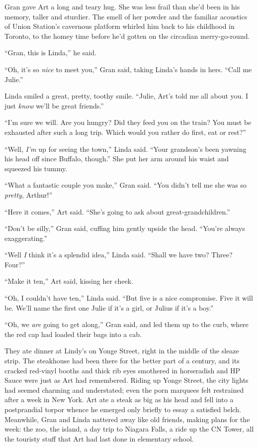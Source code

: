 Gran gave Art a long and teary hug. She was less frail than she’d
been in his memory, taller and sturdier. The smell of her powder
and the familiar acoustics of Union Station’s cavernous platform
whirled him back to his childhood in Toronto, to the homey time
before he’d gotten on the circadian merry-go-round.

“Gran, this is Linda,” he said.

“Oh, it’s so \emph{nice} to meet you,” Gran said, taking Linda’s
hands in hers. “Call me Julie.”

Linda smiled a great, pretty, toothy smile. “Julie, Art’s told me
all about you. I just \emph{know} we’ll be great friends.”

“I’m sure we will. Are you hungry? Did they feed you on the train?
You must be exhausted after such a long trip. Which would you
rather do first, eat or rest?”

“Well, \emph{I’m} up for seeing the town,” Linda said. “Your
grandson’s been yawning his head off since Buffalo, though.” She
put her arm around his waist and squeezed his tummy.

“What a fantastic couple you make,” Gran said. “You didn’t tell me
she was so \emph{pretty}, Arthur!”

“Here it comes,” Art said. “She’s going to ask about
great-grandchildren.”

“Don’t be silly,” Gran said, cuffing him gently upside the head.
“You’re always exaggerating.”

“Well \emph{I} think it’s a splendid idea,” Linda said. “Shall we
have two? Three? Four?”

“Make it ten,” Art said, kissing her cheek.

“Oh, I couldn’t have ten,” Linda said. “But five is a nice
compromise. Five it will be. We’ll name the first one Julie if it’s
a girl, or Julius if it’s a boy.”

“Oh, we \emph{are} going to get along,” Gran said, and led them up
to the curb, where the red cap had loaded their bags into a cab.

They ate dinner at Lindy’s on Yonge Street, right in the middle of
the sleaze strip. The steakhouse had been there for the better part
of a century, and its cracked red-vinyl booths and thick rib eyes
smothered in horseradish and HP Sauce were just as Art had
remembered. Riding up Yonge Street, the city lights had seemed
charming and understated; even the porn marquees felt restrained
after a week in New York. Art ate a steak as big as his head and
fell into a postprandial torpor whence he emerged only briefly to
essay a satisfied belch. Meanwhile, Gran and Linda nattered away
like old friends, making plans for the week: the zoo, the island, a
day trip to Niagara Falls, a ride up the CN Tower, all the touristy
stuff that Art had last done in elementary school.

